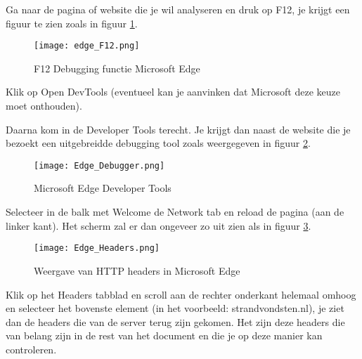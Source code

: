 
Ga naar de pagina of website die je wil analyseren en druk op F12, je krijgt een figuur te zien zoals in figuur \ref{fig:EdgeF12}.
\begin{figure}[h]
	\texttt{[image: edge\_F12.png]}
	\caption{F12 Debugging functie Microsoft Edge}
	\label{fig:EdgeF12}
\end{figure}
Klik op Open DevTools (eventueel kan je aanvinken dat Microsoft deze keuze moet onthouden).

Daarna kom in de Developer Tools terecht. Je krijgt dan naast de website die je bezoekt een uitgebreidde debugging tool zoals weergegeven in figuur \ref{fig:EdgeDebugger}.
\begin{figure}[h]
	\texttt{[image: Edge\_Debugger.png]}
	\caption{Microsoft Edge Developer Tools}
	\label{fig:EdgeDebugger}
\end{figure}


Selecteer in de balk met Welcome de Network tab en reload de pagina (aan de linker kant). Het scherm zal er dan ongeveer zo uit zien als in figuur \ref{fig:EdgeHeaders}.
\begin{figure}[h]
	\texttt{[image: Edge\_Headers.png]}
	\caption{Weergave van HTTP headers in Microsoft Edge}
	\label{fig:EdgeHeaders}
\end{figure}
Klik op het Headers tabblad en scroll aan de rechter onderkant helemaal omhoog en selecteer het bovenste element (in het voorbeeld: strandvondsten.nl), je ziet dan de headers die van de server terug zijn gekomen. Het zijn deze headers die van belang zijn in de rest van het document en die je op deze manier kan controleren.
